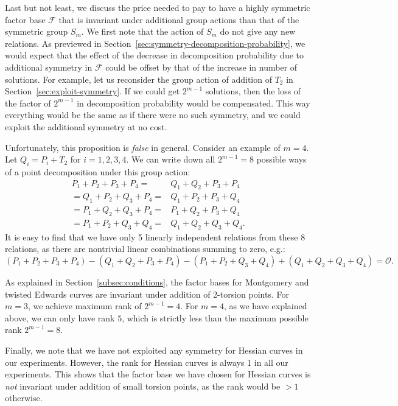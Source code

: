 Last but not least, we discuss the price needed to pay to have a
highly symmetric factor base $\mathcal F$ that is invariant under
additional group actions than that of the symmetric group $S_m$.
%
We first note that the action of $S_m$ do not give any new relations.
%
As previewed in Section~\ref{sec:symmetry-decomposition-probability},
we would expect that the effect of the decrease in decomposition
probability due to additional symmetry in $\mathcal F$ could be offset
by that of the increase in number of solutions.
%
For example, let us reconsider the group action of addition of $T_2$
in Section~\ref{sec:exploit-symmetry}.
%
If we could get $2^{m-1}$ solutions, then the loss of the factor of
$2^{m-1}$ in decomposition probability would be compensated.
%
This way everything would be the same as if there were no such
symmetry, and we could exploit the additional symmetry at no cost.

Unfortunately, this proposition is \emph{false} in general.
%
Consider an example of $m=4$.
%
Let $Q_i=P_i+ T_2$ for $i=1,2,3,4$.
%
We can write down all $2^{m-1}=8$ possible ways of a point
decomposition under this group action:
%
\[ \begin{aligned}
P_1 + P_2 + P_3 + P_4 = & Q_1 + Q_2 + P_3 + P_4 \\
= Q_1 + P_2 + Q_3 + P_4 = & Q_1 + P_2 + P_3 + Q_4 \\
= P_1 + Q_2 + Q_3 + P_4 = & P_1 + Q_2 + P_3 + Q_4 \\
= P_1 + P_2 + Q_3 + Q_4 = & Q_1 + Q_2 + Q_3 + Q_4.
\end{aligned} \]
%
It is easy to find that we have only 5 linearly independent relations
from these 8 relations, as there are nontrivial linear combinations
summing to zero, e.g.:
\[ (P_1 + P_2 + P_3 + P_4) - (Q_1 + Q_2 + P_3 + P_4) - (P_1 + P_2 +
  Q_3 + Q_4) + (Q_1 + Q_2 + Q_3 + Q_4) = \mathcal O.\]


As explained in Section~\ref{subsec:conditions}, the factor bases for
Montgomery and twisted Edwards curves are invariant under addition of
2-torsion points.
%
For $m=3$, we achieve maximum rank of $2^{m-1}=4$.
%
For $m=4$, as we have explained above, we can only have rank $5$, 
which is strictly less than the maximum possible rank $2^{m-1}=8$.

Finally, we note that we have not exploited any symmetry for Hessian
curves in our experiments.
%
However, the rank for Hessian curves is always 1 in all our
experiments.
%
This shows that the factor base we have chosen for Hessian curves is
\emph{not} invariant under addition of small torsion points, as the
rank would be $>1$ otherwise.





